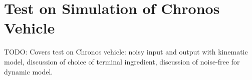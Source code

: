 \chapter{Test on Simulation of Chronos Vehicle}\label{chap:test-chronos}
TODO: Covers test on Chronos vehicle: noisy input and output with kinematic model, discussion of choice of terminal ingredient, discussion of  noise-free for dynamic model.